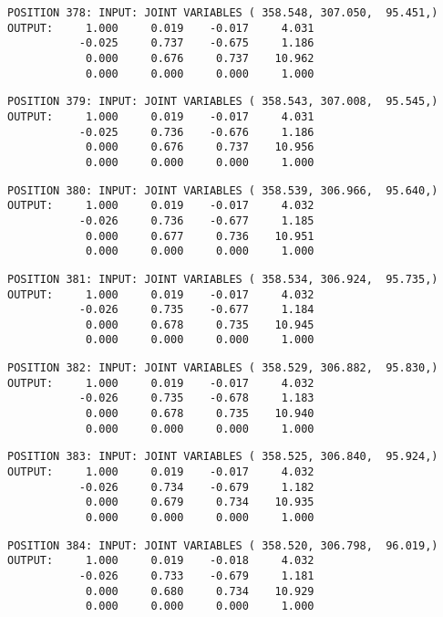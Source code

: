\begin{verbatim}
POSITION 378: INPUT: JOINT VARIABLES ( 358.548, 307.050,  95.451,)
OUTPUT:     1.000     0.019    -0.017     4.031
           -0.025     0.737    -0.675     1.186
            0.000     0.676     0.737    10.962
            0.000     0.000     0.000     1.000
\end{verbatim} \pagebreak[1]\begin{verbatim}
POSITION 379: INPUT: JOINT VARIABLES ( 358.543, 307.008,  95.545,)
OUTPUT:     1.000     0.019    -0.017     4.031
           -0.025     0.736    -0.676     1.186
            0.000     0.676     0.737    10.956
            0.000     0.000     0.000     1.000
\end{verbatim} \pagebreak[1]\begin{verbatim}
POSITION 380: INPUT: JOINT VARIABLES ( 358.539, 306.966,  95.640,)
OUTPUT:     1.000     0.019    -0.017     4.032
           -0.026     0.736    -0.677     1.185
            0.000     0.677     0.736    10.951
            0.000     0.000     0.000     1.000
\end{verbatim} \pagebreak[1]\begin{verbatim}
POSITION 381: INPUT: JOINT VARIABLES ( 358.534, 306.924,  95.735,)
OUTPUT:     1.000     0.019    -0.017     4.032
           -0.026     0.735    -0.677     1.184
            0.000     0.678     0.735    10.945
            0.000     0.000     0.000     1.000
\end{verbatim} \pagebreak[1]\begin{verbatim}
POSITION 382: INPUT: JOINT VARIABLES ( 358.529, 306.882,  95.830,)
OUTPUT:     1.000     0.019    -0.017     4.032
           -0.026     0.735    -0.678     1.183
            0.000     0.678     0.735    10.940
            0.000     0.000     0.000     1.000
\end{verbatim} \pagebreak[1]\begin{verbatim}
POSITION 383: INPUT: JOINT VARIABLES ( 358.525, 306.840,  95.924,)
OUTPUT:     1.000     0.019    -0.017     4.032
           -0.026     0.734    -0.679     1.182
            0.000     0.679     0.734    10.935
            0.000     0.000     0.000     1.000
\end{verbatim} \pagebreak[1]\begin{verbatim}
POSITION 384: INPUT: JOINT VARIABLES ( 358.520, 306.798,  96.019,)
OUTPUT:     1.000     0.019    -0.018     4.032
           -0.026     0.733    -0.679     1.181
            0.000     0.680     0.734    10.929
            0.000     0.000     0.000     1.000
\end{verbatim} \pagebreak[1]\begin{verbatim}

\end{verbatim}
